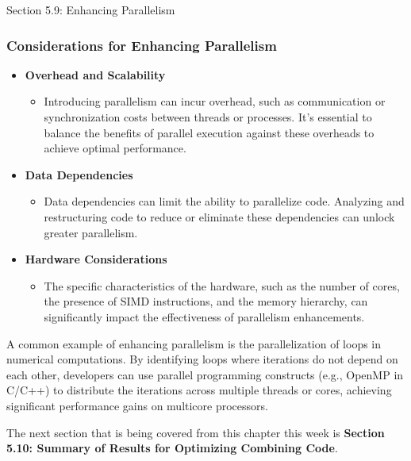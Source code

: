 \begin{notes}{Section 5.9: Enhancing Parallelism}
    \subsubsection*{Considerations for Enhancing Parallelism}
    
    \begin{itemize}
        \item \textbf{Overhead and Scalability}
        \begin{itemize}
            \item Introducing parallelism can incur overhead, such as communication or synchronization costs between threads or processes. It's essential to balance the benefits of parallel execution 
            against these overheads to achieve optimal performance.
        \end{itemize}
        \item \textbf{Data Dependencies}
        \begin{itemize}
            \item Data dependencies can limit the ability to parallelize code. Analyzing and restructuring code to reduce or eliminate these dependencies can unlock greater parallelism.
        \end{itemize}
        \item \textbf{Hardware Considerations}
        \begin{itemize}
            \item The specific characteristics of the hardware, such as the number of cores, the presence of SIMD instructions, and the memory hierarchy, can significantly impact the effectiveness of 
            parallelism enhancements.
        \end{itemize}
    \end{itemize}
    
    \begin{highlight}
        A common example of enhancing parallelism is the parallelization of loops in numerical computations. By identifying loops where iterations do not depend on each other, developers can use parallel 
        programming constructs (e.g., OpenMP in C/C++) to distribute the iterations across multiple threads or cores, achieving significant performance gains on multicore processors.
    \end{highlight}    
\end{notes}

The next section that is being covered from this chapter this week is \textbf{Section 5.10: Summary of Results for Optimizing Combining Code}.

